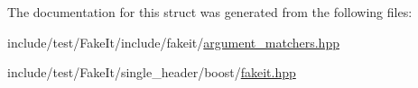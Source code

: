 The documentation for this struct was generated from the following files\+:\begin{DoxyCompactItemize}
\item 
include/test/\+Fake\+It/include/fakeit/\mbox{\hyperlink{argument__matchers_8hpp}{argument\+\_\+matchers.\+hpp}}\item 
include/test/\+Fake\+It/single\+\_\+header/boost/\mbox{\hyperlink{single__header_2boost_2fakeit_8hpp}{fakeit.\+hpp}}\end{DoxyCompactItemize}
